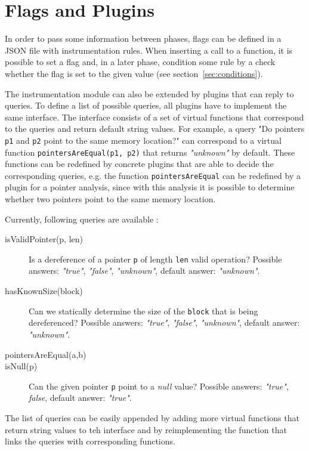 \section{Flags and Plugins}

In order to pass some information between phases, flags can be defined in a
JSON file with instrumentation rules. When inserting a call to a function, it
is possible to set a flag and, in a later phase, condition some rule by a check
whether the flag is set to the given value (see section~\ref{sec:conditions}).

The instrumentation module can also be extended by plugins that can reply to
queries. To define a list of possible queries, all plugins have to implement
the same interface. The interface consists of a set of virtual functions that
correspond to the queries and return default string values. For example, a
query "Do pointers \texttt{p1} and \texttt{p2} point to the same memory
location?" can correspond to a virtual function \texttt{pointersAreEqual(p1,
p2)} that returns \emph{"unknown"} by default. These functions can be redefined
by concrete plugins that are able to decide the corresponding queries, e.g.
the function \texttt{pointersAreEqual} can be redefined by a plugin for a
pointer analysis, since with this analysis it is possible to determine whether
two pointers point to the same memory location.

Currently, following queries are available :
\begin{description}
  \item[isValidPointer(p, len)] Is a dereference of a pointer \texttt{p} of
  length \texttt{len} valid operation? Possible answers: \emph{"true"},
  \emph{"false"}, \emph{"unknown"}, default answer: \emph{"unknown"}.
  \item[hasKnownSize(block)] Can we statically determine the size of the
  \texttt{block} that is being dereferenced? Possible answers: \emph{"true"},
  \emph{"false"}, \emph{"unknown"}, default answer: \emph{"unknown"}.
  \item[pointersAreEqual(a,b)]
  \item[isNull(p)] Can the given pointer \texttt{p} point to a \emph{null}
  value? Possible answers: \emph{"true"}, \emph{false}, default answer:
  \emph{"true"}.
\end{description}
The list of queries can be easily appended by adding more virtual functions
that return string values to teh interface and by reimplementing the function
that links the queries with corresponding functions.

